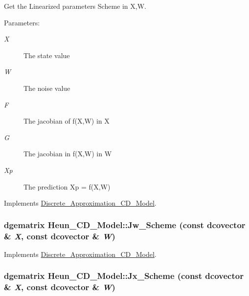 Get the Linearized parameters Scheme in X,W. 

\begin{Desc}
\item[Parameters:]
\begin{description}
\item[{\em X}]The state value \item[{\em W}]The noise value \item[{\em F}]The jacobian of f(X,W) in X \item[{\em G}]The jacobian in f(X,W) in W \item[{\em Xp}]The prediction Xp = f(X,W) \end{description}
\end{Desc}


Implements \hyperlink{class_discrete___approximation___c_d___model_0a486fada10e6f5569d186edc7b32110}{Discrete\_\-Approximation\_\-CD\_\-Model}.\hypertarget{class_heun___c_d___model_000fb9b8dbfb8171b8f330d7fc6d0dce}{
\subsubsection[{Jw\_\-Scheme}]{\setlength{\rightskip}{0pt plus 5cm}dgematrix Heun\_\-CD\_\-Model::Jw\_\-Scheme (const dcovector \& {\em X}, \/  const dcovector \& {\em W})}}
\label{class_heun___c_d___model_000fb9b8dbfb8171b8f330d7fc6d0dce}




Implements \hyperlink{class_discrete___approximation___c_d___model_c7496999409a3f05125ceb7fe85e85ab}{Discrete\_\-Approximation\_\-CD\_\-Model}.\hypertarget{class_heun___c_d___model_322cd83c0b81c2ed81483f42123f08e6}{
\subsubsection[{Jx\_\-Scheme}]{\setlength{\rightskip}{0pt plus 5cm}dgematrix Heun\_\-CD\_\-Model::Jx\_\-Scheme (const dcovector \& {\em X}, \/  const dcovector \& {\em W})}}
\label{class_heun___c_d___model_322cd83c0b81c2ed81483f42123f08e6}




